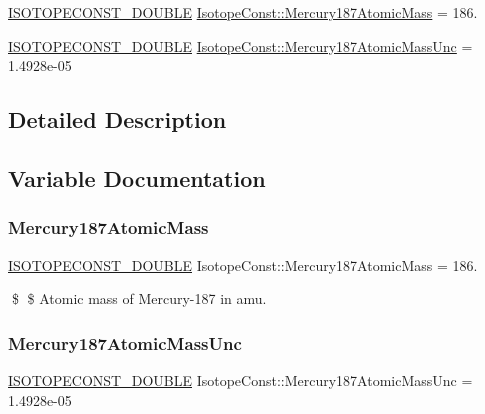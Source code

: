 \begin{DoxyCompactItemize}
\item 
\mbox{\hyperlink{group___isotope_const-_macros_ga8f45a7272ce02c0b4c65c44636ed719a}{I\+S\+O\+T\+O\+P\+E\+C\+O\+N\+S\+T\+\_\+\+D\+O\+U\+B\+LE}} \mbox{\hyperlink{group___isotope_const-_mercury-_hg187_ga2f232603a178dfc89b7b88c6b1e431f4}{Isotope\+Const\+::\+Mercury187\+Atomic\+Mass}} = 186.
\item 
\mbox{\hyperlink{group___isotope_const-_macros_ga8f45a7272ce02c0b4c65c44636ed719a}{I\+S\+O\+T\+O\+P\+E\+C\+O\+N\+S\+T\+\_\+\+D\+O\+U\+B\+LE}} \mbox{\hyperlink{group___isotope_const-_mercury-_hg187_gaf02de49e4aa1b96779de62532997340e}{Isotope\+Const\+::\+Mercury187\+Atomic\+Mass\+Unc}} = 1.\+4928e-\/05
\end{DoxyCompactItemize}


\subsection{Detailed Description}


\subsection{Variable Documentation}
\mbox{\label{group___isotope_const-_mercury-_hg187_ga2f232603a178dfc89b7b88c6b1e431f4}} 
\subsubsection{\texorpdfstring{Mercury187\+Atomic\+Mass}{Mercury187AtomicMass}}
{\footnotesize\ttfamily \mbox{\hyperlink{group___isotope_const-_macros_ga8f45a7272ce02c0b4c65c44636ed719a}{I\+S\+O\+T\+O\+P\+E\+C\+O\+N\+S\+T\+\_\+\+D\+O\+U\+B\+LE}} Isotope\+Const\+::\+Mercury187\+Atomic\+Mass = 186.}

\$ \$ Atomic mass of Mercury-\/187 in amu. \mbox{\label{group___isotope_const-_mercury-_hg187_gaf02de49e4aa1b96779de62532997340e}} 
\subsubsection{\texorpdfstring{Mercury187\+Atomic\+Mass\+Unc}{Mercury187AtomicMassUnc}}
{\footnotesize\ttfamily \mbox{\hyperlink{group___isotope_const-_macros_ga8f45a7272ce02c0b4c65c44636ed719a}{I\+S\+O\+T\+O\+P\+E\+C\+O\+N\+S\+T\+\_\+\+D\+O\+U\+B\+LE}} Isotope\+Const\+::\+Mercury187\+Atomic\+Mass\+Unc = 1.\+4928e-\/05}

